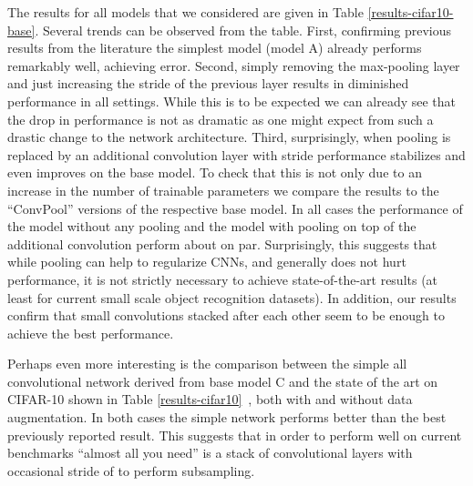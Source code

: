 \documentclass{article} \usepackage{iclr2015,times}
\begin{document}
The results for all models that we considered are given in Table \ref{results-cifar10-base}.
Several trends can be observed from the table. First, confirming
previous results from the literature \citep{Srivastava14a} the simplest
model (model A) already performs remarkably well, achieving 
error. Second, simply removing the max-pooling layer and just increasing the
stride of the previous layer results in diminished performance in all
settings. While this is to be expected we can already see that the
drop in performance is not as dramatic as one might expect from such a
drastic change to the network architecture.
Third, surprisingly, when pooling is replaced by an additional convolution layer
with stride  performance stabilizes and even improves on the
base model. To check that this is not only due to
an increase in the number of trainable parameters we compare the results to the \mbox{``ConvPool''}
versions of the respective base model. In all cases the performance of
the model without any pooling and the model with pooling on top of the
additional convolution perform about on par. Surprisingly, this suggests that while
pooling can help to regularize CNNs, and generally does not hurt
performance, it is not strictly necessary to achieve state-of-the-art
results (at least for current small scale object recognition
datasets). In addition, our results confirm that small 
convolutions stacked after each other seem to be enough to achieve the
best performance.

Perhaps even more interesting is the comparison between the simple all
convolutional network derived from base model C and the state of the art on CIFAR-10 shown in Table
\ref{results-cifar10}~, both with and without data augmentation. In both
cases the simple network performs better than the best previously
reported result.
This suggests that in order to perform well on
current benchmarks ``almost all you need'' is a stack of convolutional
layers with occasional stride of  to perform subsampling. 
\end{document}
